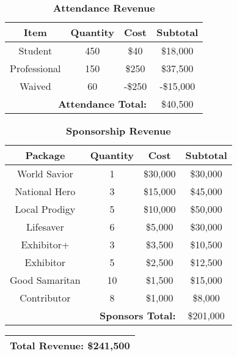 \begin{table}[H]
\centering
\caption*{\textbf{Attendance Revenue}}
\begin{tabular}{|c|c|c|c|}
\hline
    \textbf{Item} & \textbf{Quantity} & \textbf{Cost} & \textbf{Subtotal}	\\ 
\hline
	Student			&	450	&	\$40	&	\$18,000						\\
	Professional	&	150	& 	\$250	&	\$37,500						\\
	Waived			&	60	& 	-\$250	&	-\$15,000						\\
\hline
	\multicolumn{3}{|r|}{\textbf{Attendance Total:}}	&	\$40,500		\\
\hline
\end{tabular}
\end{table}


\begin{table}[H]
\centering
\caption*{\textbf{Sponsorship Revenue}}
\begin{tabular}{|c|c|c|c|}
\hline
    \textbf{Package} & \textbf{Quantity} & \textbf{Cost} & \textbf{Subtotal}	\\ 
\hline
	World Savior	&	1	&	\$30,000	&	\$30,000						\\
	National Hero	&	3	& 	\$15,000	&	\$45,000						\\
	Local Prodigy	&	5	& 	\$10,000	&	\$50,000						\\
	Lifesaver		&	6	& 	\$5,000		&	\$30,000						\\
	Exhibitor+		&	3	& 	\$3,500		&	\$10,500						\\
	Exhibitor		&	5	& 	\$2,500		&	\$12,500						\\
	Good Samaritan	&	10	& 	\$1,500		&	\$15,000						\\
	Contributor		&	8	& 	\$1,000		&	\$8,000							\\
\hline
	\multicolumn{3}{|r|}{\textbf{Sponsors Total:}}	&	\$201,000				\\
\hline
\end{tabular}
\end{table}


\begin{table}[H]
\centering
\begin{tabular}{|c|}
\hline
    \textbf{Total Revenue: \$241,500}\\ 
\hline
\end{tabular}
\end{table}

